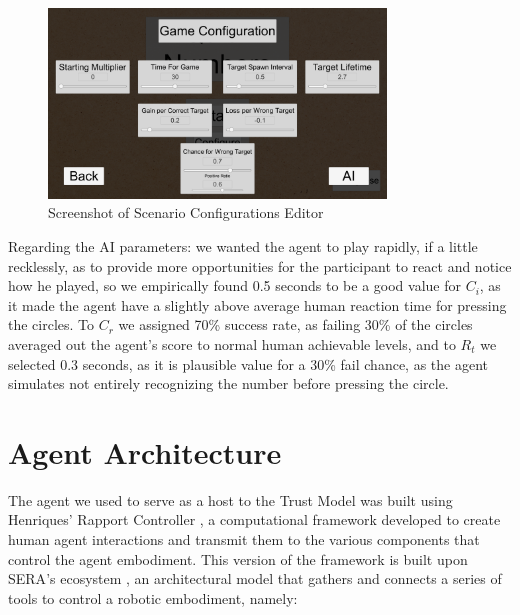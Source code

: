 \begin{figure}[hbt]
    \centering
    \includegraphics[width=0.8\textwidth]{figures/GameConfigs.png}
    \caption{Screenshot of Scenario Configurations Editor}
    \label{fig:ScenarioConfigs}
\end{figure}

Regarding the \ac{AI} parameters: we wanted the agent to play rapidly, if a little recklessly, as to provide more opportunities for the participant to react and notice how he played, so we empirically found 0.5 seconds to be a good value for $C_i$, as it made the agent have a slightly above average human reaction time for pressing the circles. To $C_r$ we assigned 70\% success rate, as failing 30\% of the circles averaged out the agent's score to normal human achievable levels, and to $R_t$ we selected 0.3 seconds, as it is plausible value for a 30\% fail chance, as the agent simulates not entirely recognizing the number before pressing the circle.


\section{Agent Architecture}
The agent we used to serve as a host to the Trust Model was built using Henriques' Rapport Controller \cite{Henriques2016}, a computational framework developed to create human agent interactions and transmit them to the various components that control the agent embodiment. This version of the framework is built upon \ac{SERA}'s ecosystem \cite{Ribeiro2003}, an architectural model that gathers and connects a series of tools to control a robotic embodiment, namely:

